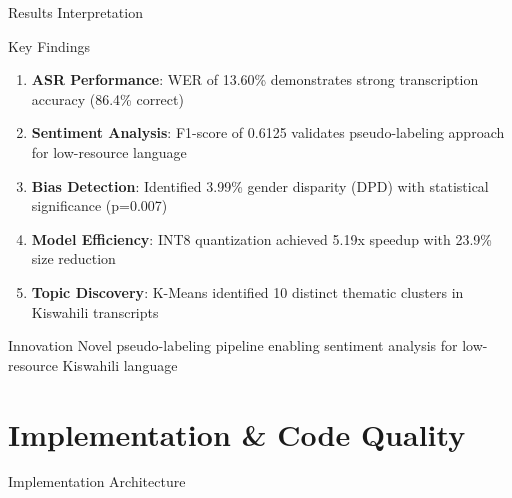 \documentclass[aspectratio=169,10pt]{beamer}
\begin{document}
\begin{frame}{Results Interpretation}
\begin{block}{Key Findings}
\begin{enumerate}
    \item \textbf{ASR Performance}: WER of 13.60\% demonstrates strong transcription accuracy (86.4\% correct)
    \item \textbf{Sentiment Analysis}: F1-score of 0.6125 validates pseudo-labeling approach for low-resource language
    \item \textbf{Bias Detection}: Identified 3.99\% gender disparity (DPD) with statistical significance (p=0.007)
    \item \textbf{Model Efficiency}: INT8 quantization achieved 5.19x speedup with 23.9\% size reduction
    \item \textbf{Topic Discovery}: K-Means identified 10 distinct thematic clusters in Kiswahili transcripts
\end{enumerate}
\end{block}

\begin{alertblock}{Innovation}
Novel pseudo-labeling pipeline enabling sentiment analysis for low-resource Kiswahili language
\end{alertblock}
\end{frame}

\section{Implementation \& Code Quality}

\begin{frame}{Implementation Architecture}
\begin{center}
\vspace{-0.3cm}
\scalebox{0.38}{

}
\end{center}
\end{frame}
\end{document}

